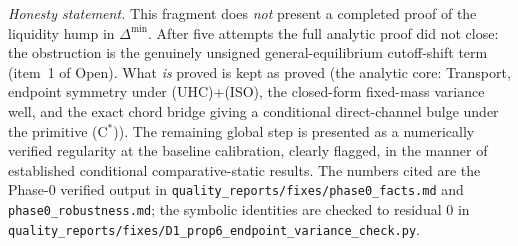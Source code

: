 \noindent\emph{Honesty statement.} This fragment does \emph{not} present a
completed proof of the liquidity hump in $\Delta^{\min}$. After five attempts the
full analytic proof did not close: the obstruction is the genuinely unsigned
general-equilibrium cutoff-shift term (item~1 of Open). What \emph{is} proved is
kept as proved (the analytic core: Transport, endpoint symmetry under (UHC)+(ISO),
the closed-form fixed-mass variance well, and the exact chord bridge giving a
conditional direct-channel bulge under the primitive (C$^\ast$)). The remaining
global step is presented as a numerically verified regularity at the baseline
calibration, clearly flagged, in the manner of established conditional
comparative-static results. The numbers cited are the Phase-0 verified output in
\texttt{quality\_reports/fixes/phase0\_facts.md} and \texttt{phase0\_robustness.md};
the symbolic identities are checked to residual $0$ in
\texttt{quality\_reports/fixes/D1\_prop6\_endpoint\_variance\_check.py}.

